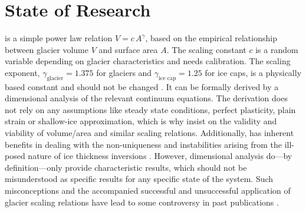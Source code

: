 
\section{State of Research} %
\label{sec:state_of_research}

    \Vas{} is a simple power law relation $ V = c\,A^\gamma$, based on the empirical relationship between glacier volume $V$ and surface area $A$. The scaling constant $c$ is a random variable depending on glacier characteristics and needs calibration. The scaling exponent, $\gamma_\text{glacier} = 1.375$ for glaciers and $\gamma_\text{ice cap} = 1.25$ for ice caps, is a physically based constant and should not be changed \citep{Bahr1997b}. It can be formally derived by a dimensional analysis of the relevant continuum equations. The derivation does not rely on any assumptions like steady state conditions, perfect plasticity, plain strain or shallow-ice approximation, which is why \citet{Bahr2015} insist on the validity and viability of volume/area and similar scaling relations. Additionally, \vas{} has inherent benefits in dealing with the non-uniqueness and instabilities arising from the ill-posed nature of ice thickness inversions \citep{Bahr2014}. However, dimensional analysis do---by definition---only provide characteristic results, which should not be misunderstood as specific results for any specific state of the system. Such misconceptions and the accompanied successful and unsuccessful application of glacier scaling relations have lead to some controversy in past publications \citep[][see Table 1 for an overview]{Bahr2015}.

